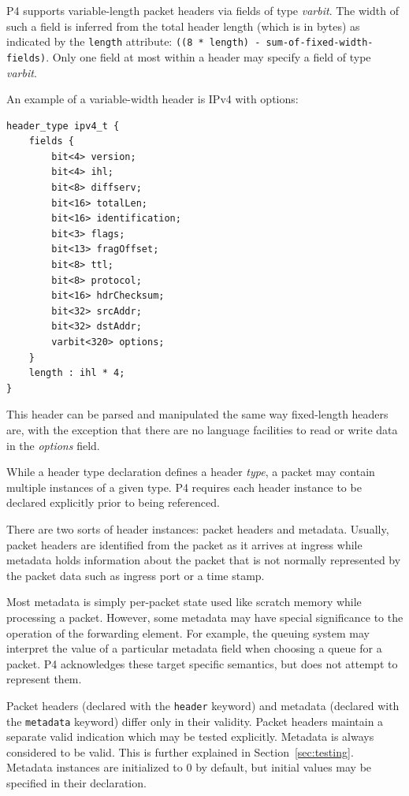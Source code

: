 \documentclass[12pt]{article}
\begin{document}
P4 supports variable-length packet headers via fields of type \textit{varbit}.
The width of such a field is inferred from the total header length (which
is in bytes) as indicated by the \texttt{length} attribute: \texttt{((8 *
length) - sum-of-fixed-width-fields)}. Only one field at most within a header
may specify a field of type \textit{varbit}.

An example of a variable-width header is IPv4 with options:

\begin{lstlisting}[style=P4style]
header_type ipv4_t {
    fields {
        bit<4> version;
        bit<4> ihl;
        bit<8> diffserv;
        bit<16> totalLen;
        bit<16> identification;
        bit<3> flags;
        bit<13> fragOffset;
        bit<8> ttl;
        bit<8> protocol;
        bit<16> hdrChecksum;
        bit<32> srcAddr;
        bit<32> dstAddr;
        varbit<320> options;
    }
    length : ihl * 4;
}
\end{lstlisting}

This header can be parsed and manipulated the same way fixed-length headers
are, with the exception that there are no language facilities to read or
write data in the \textit{options} field.


While a header type declaration defines a header \textit{type}, a packet may contain 
multiple instances of a given type.  P4 requires each header instance to 
be declared explicitly prior to being referenced. 

There are two sorts of header instances: packet headers and metadata. Usually, 
packet headers are identified from the packet as it arrives at ingress while 
metadata holds information about the packet that is not normally represented 
by the packet data such as ingress port or a time stamp.  

Most metadata is simply per-packet state used like scratch memory while
processing a packet. However, some metadata may have special significance to
the operation  of the forwarding element. For example, the queuing system may
interpret the value of a particular metadata field when choosing a queue for a
packet. P4 acknowledges these target specific semantics, but does not attempt
to represent them.

Packet headers (declared with the \texttt{header} keyword) and metadata (declared 
with the \texttt{metadata} keyword) differ only in their validity. Packet headers 
maintain a separate valid indication which may be tested explicitly. Metadata 
is always considered to be valid. This is further explained in 
Section~\ref{sec:testing}.  Metadata instances are 
initialized to 0 by default, but initial values may be specified in their 
declaration.
\end{document}
